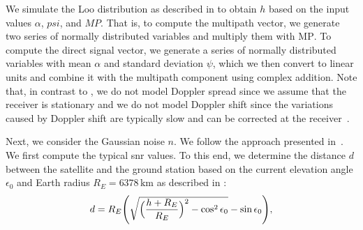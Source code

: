 \documentclass[conference]{IEEEtran}
\newcommand\MP{\ensuremath{\mathrm{MP}}\xspace}
\begin{document}
We simulate the Loo distribution as described in \cite{DBLP:journals/ijscn/Perez-FontanMMPMMR08} to obtain $h$ based on the input values $\alpha$, $psi$, and $MP$.
That is, to compute the multipath vector, we generate two series of normally distributed variables and multiply them with \MP.
To compute the direct signal vector, we generate a series of normally distributed variables with mean $\alpha$ and standard deviation $\psi$, which we then convert to linear units and combine it with the multipath component using complex addition.
Note that, in contrast to \cite{DBLP:journals/ijscn/Perez-FontanMMPMMR08}, we do not model Doppler spread since we assume that the receiver is stationary and we do not model Doppler shift since the variations caused by Doppler shift are typically slow and can be corrected at the receiver~\cite{DBLP:journals/ijscn/Perez-FontanMMPMMR08}. 






Next, we consider the Gaussian noise $n$. We follow the approach presented in~\cite{satjscc}. 
We first compute the typical \ac{snr} values. 
To this end, we determine the distance $d$ between the satellite and the ground station based on the current elevation angle $\epsilon_0$ and Earth radius $R_E = 6378\,\textrm{km}$ as described in \cite{7506756}:
%
\begin{equation}
  d = R_E\Biggl(\sqrt{\Bigl(\frac{h + R_E}{R_E}\Bigr)^2 - \cos^{2}\epsilon_{0}} - \sin\epsilon_{0}\Biggr),
\end{equation}
%
\end{document}
